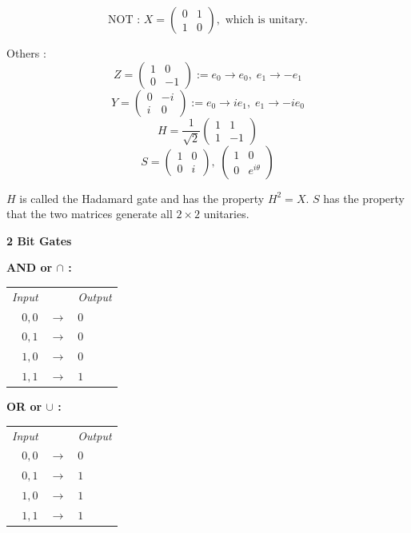 \documentclass[12pt]{article}
\theoremstyle{definition}
\begin{document}
\[
\text{NOT : } X = \begin{pmatrix}0&1\\1&0\end{pmatrix}, \text{ which is unitary.}
\]

Others :
\[
Z = \begin{pmatrix}1&0\\0&-1\end{pmatrix} := e_0 \to e_0,\; e_1 \to -e_1
\]
\[
Y = \begin{pmatrix}0&-i\\i&0\end{pmatrix} := e_0 \to ie_1,\; e_1 \to -ie_0
\]
\[
H = \frac{1}{\sqrt{2}}\begin{pmatrix}1&1\\1&-1\end{pmatrix}
\]
\[
S = \begin{pmatrix}1&0\\0&i\end{pmatrix},\; \begin{pmatrix}1&0\\0&e^{i\theta}\end{pmatrix}
\]

$H$ is called the Hadamard gate and has the property $H^2 = X$. $S$ has the property that the two matrices generate all $2 \times 2$ unitaries.

\begin{center}
\textbf{2 Bit Gates}
\end{center}

\textbf{AND or $\cap$ :}
\begin{center}
\begin{tabular}{rcl}
\textit{Input} & & \textit{Output} \\
$0,0$ & $\to$ & $0$ \\
$0,1$ & $\to$ & $0$ \\
$1,0$ & $\to$ & $0$ \\
$1,1$ & $\to$ & $1$
\end{tabular}
\end{center}

\textbf{OR or $\cup$ :}
\begin{center}
\begin{tabular}{rcl}
\textit{Input} & & \textit{Output} \\
$0,0$ & $\to$ & $0$ \\
$0,1$ & $\to$ & $1$ \\
$1,0$ & $\to$ & $1$ \\
$1,1$ & $\to$ & $1$
\end{tabular}
\end{center}
\end{document}
